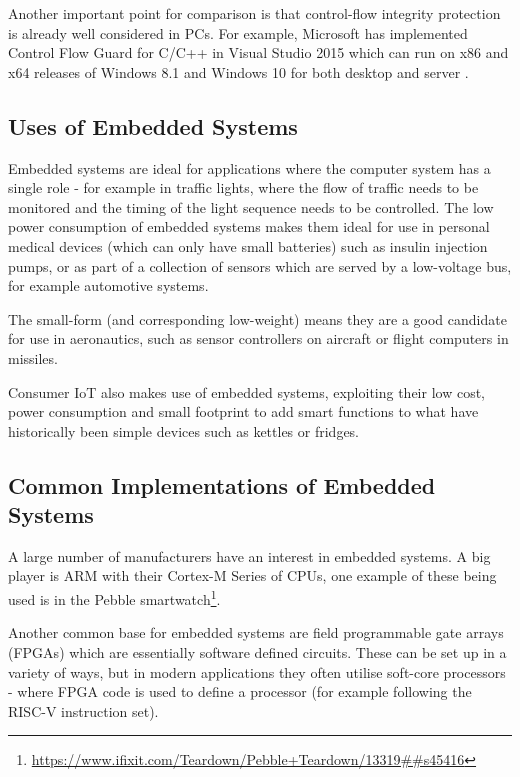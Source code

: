 Another important point for comparison is that control-flow integrity protection is already well considered in PCs. For example, Microsoft has implemented Control Flow Guard for C\slash C++ in Visual Studio 2015 which can run on x86 and x64 releases of Windows 8.1 and Windows 10 for both desktop and server \cite{MicrosoftCorporation2018}. 

\subsection{Uses of Embedded Systems}\label{usesEmbeddedSystems}

Embedded systems are ideal for applications where the computer system has a single role - for example in traffic lights, where the flow of traffic needs to be monitored and the timing of the light sequence needs to be controlled. The low power consumption of embedded systems makes them ideal for use in personal medical devices (which can only have small batteries) such as insulin injection pumps, or as part of a collection of sensors which are served by a low-voltage bus, for example automotive systems.

The small-form (and corresponding low-weight) means they are a good candidate for use in aeronautics, such as sensor controllers on aircraft or flight computers in missiles.

Consumer IoT also makes use of embedded systems, exploiting their low cost, power consumption and small footprint to add smart functions to what have historically been simple devices such as kettles or fridges.

\subsection{Common Implementations of Embedded Systems}\label{implementationsEmbeddedSystems}
A large number of manufacturers have an interest in embedded systems. A big player is ARM with their Cortex-M Series of CPUs, one example of these being used is in the Pebble smartwatch\footnote{\url{https://www.ifixit.com/Teardown/Pebble+Teardown/13319##s45416}}.

Another common base for embedded systems are field programmable gate arrays (FPGAs) which are essentially software defined circuits. These can be set up in a variety of ways, but in modern applications they often utilise soft-core processors - where FPGA code is used to define a processor (for example following the RISC-V instruction set).
